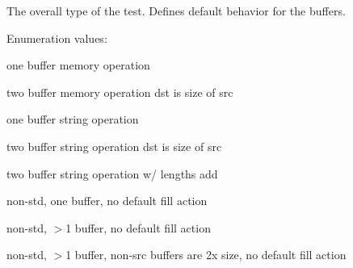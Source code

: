 The overall type of the test. Defines default behavior for the buffers.

\begin{Desc}
\item[Enumeration values: ]\par
\begin{description}
\item[{\em 
{\em MEM}\label{test__utils_8h_a53a22}
}]one buffer memory operation \item[{\em 
{\em MEM\_\-TO\_\-MEM}\label{test__utils_8h_a53a23}
}]two buffer memory operation dst is size of src \item[{\em 
{\em ZSTR}\label{test__utils_8h_a53a24}
}]one buffer string operation \item[{\em 
{\em ZSTR\_\-TO\_\-ZSTR}\label{test__utils_8h_a53a25}
}]two buffer string operation dst is size of src \item[{\em 
{\em ZSTR\_\-CAT\_\-ZSTR}\label{test__utils_8h_a53a26}
}]two buffer string operation w/ lengths add \item[{\em 
{\em CUSTOM\_\-ONE}\label{test__utils_8h_a53a27}
}]non-std, one buffer, no default fill action \item[{\em 
{\em CUSTOM\_\-MORE}\label{test__utils_8h_a53a28}
}]non-std, $>$1 buffer, no default fill action \item[{\em 
{\em CUSTOM\_\-CAT}\label{test__utils_8h_a53a29}
}]non-std, $>$1 buffer, non-src buffers are 2x size, no default fill action \end{description}
\end{Desc}



